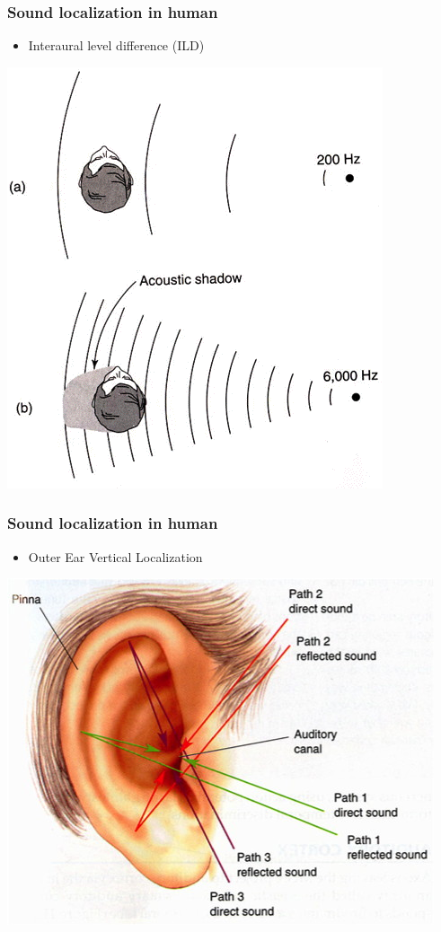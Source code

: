 \documentclass{beamer}
\begin{document}
\begin{frame}
\frametitle{Sound localization in human}
\begin{itemize}
  \item Interaural level difference (ILD)
\end{itemize}
\begin{center}
  \includegraphics[width=.5\textwidth]{ild}
\end{center}
\end{frame}

\begin{frame}
\frametitle{Sound localization in human}
\begin{itemize}
  \item Outer Ear Vertical Localization
\end{itemize}
\begin{center}
  \includegraphics[width=.7\textwidth]{vertical}
\end{center}
\end{frame}
\end{document}
